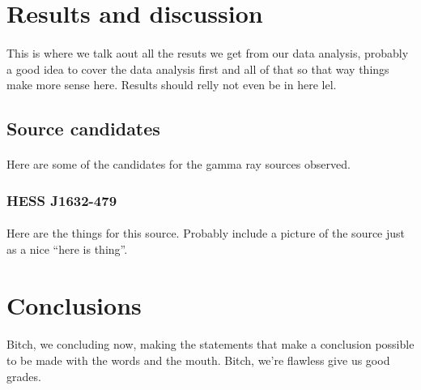\documentclass[a4paper, titlepage, oneside]{article}
\begin{document}
\begin{multicols}{2}
\section{Results and discussion}
\paragraph{}
This is where we talk aout all the resuts we get from our data analysis, probably a good idea to cover the data analysis first and all of that so that way things make more sense here. Results should relly not even be in here lel.

\subsection{Source candidates}
\paragraph{}
Here are some of the candidates for the gamma ray sources observed.

\subsubsection{HESS J1632-479}
\paragraph{}
Here are the things for this source. Probably include a picture of the source just as a nice ``here is thing''.

\section{Conclusions}
\paragraph{}
Bitch, we concluding now, making the statements that make a conclusion possible to be made with the words and the mouth. Bitch, we're flawless give us good grades.
\end{multicols}

\printbibliography[heading = bibintoc] %
\end{document}
